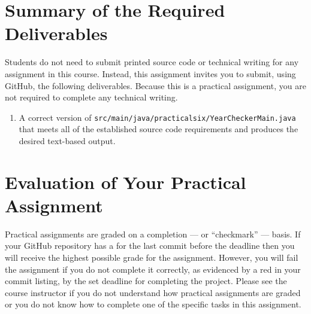 \documentclass[11pt]{article}
\newcommand{\mainprogramsource}{\lstinline{src/main/java/practicalsix/YearCheckerMain.java}}
\newcommand{\checkmark}{\ding{51}}
\newcommand{\naughtmark}{\ding{55}}
\begin{document}


\section*{Summary of the Required Deliverables}

\noindent Students do not need to submit printed source code or technical
writing for any assignment in this course. Instead, this assignment invites you
to submit, using GitHub, the following deliverables. Because this is a practical
assignment, you are not required to complete any technical writing.

\begin{enumerate}

\setlength{\itemsep}{0in}

\item A correct version of \mainprogramsource{} that meets all of the established source code requirements and produces
  the desired text-based output.

\end{enumerate}

\section*{Evaluation of Your Practical Assignment}

Practical assignments are graded on a completion --- or ``checkmark'' --- basis.
If your GitHub repository has a \checkmark{} for the last commit before the
deadline then you will receive the highest possible grade for the assignment.
However, you will fail the assignment if you do not complete it correctly, as
evidenced by a red \naughtmark{} in your commit listing, by the set deadline for
completing the project. Please see the course instructor if you do not
understand how practical assignments are graded or you do not know how to
complete one of the specific tasks in this assignment.
\end{document}
